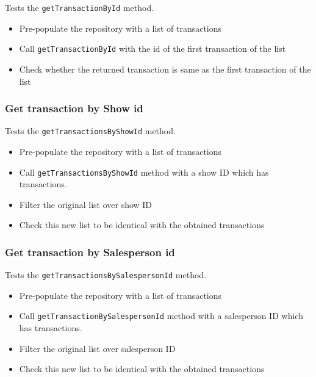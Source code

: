 \documentclass[]{article}
\providecommand{\tightlist}{%
  \setlength{\itemsep}{0pt}\setlength{\parskip}{0pt}}
\begin{document}
Tests the \texttt{getTransactionById} method.

\begin{itemize}
\tightlist
\item
  Pre-populate the repository with a list of transactions
\item
  Call \texttt{getTransactionById} with the id of the first transaction
  of the list
\item
  Check whether the returned transaction is same as the first
  transaction of the list
\end{itemize}

\hypertarget{get-transaction-by-show-id}{%
\subsubsection{Get transaction by Show
id}\label{get-transaction-by-show-id}}

Tests the \texttt{getTransactionsByShowId} method.

\begin{itemize}
\tightlist
\item
  Pre-populate the repository with a list of transactions
\item
  Call \texttt{getTransactionsByShowId} method with a show ID which has
  transactions.
\item
  Filter the original list over show ID
\item
  Check this new list to be identical with the obtained transactions
\end{itemize}

\hypertarget{get-transaction-by-salesperson-id}{%
\subsubsection{Get transaction by Salesperson
id}\label{get-transaction-by-salesperson-id}}

Tests the \texttt{getTransactionsBySalespersonId} method.

\begin{itemize}
\tightlist
\item
  Pre-populate the repository with a list of transactions
\item
  Call \texttt{getTransactionBySalespersonId} method with a salesperson
  ID which has transactions.
\item
  Filter the original list over salesperson ID
\item
  Check this new list to be identical with the obtained transactions
\end{itemize}
\end{document}
